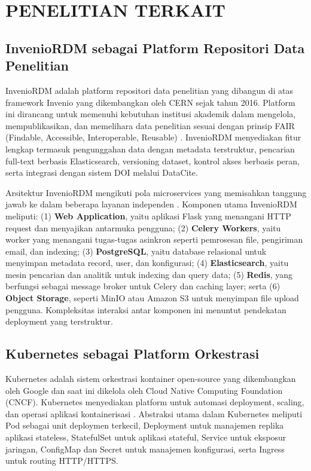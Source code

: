 \chapter{PENELITIAN TERKAIT}

\section{InvenioRDM sebagai Platform Repositori Data Penelitian}

InvenioRDM adalah platform repositori data penelitian yang dibangun di atas framework Invenio yang dikembangkan oleh CERN sejak tahun 2016. Platform ini dirancang untuk memenuhi kebutuhan institusi akademik dalam mengelola, mempublikasikan, dan memelihara data penelitian sesuai dengan prinsip FAIR (Findable, Accessible, Interoperable, Reusable) \citep{invenio2024}. InvenioRDM menyediakan fitur lengkap termasuk pengunggahan data dengan metadata terstruktur, pencarian full-text berbasis Elasticsearch, versioning dataset, kontrol akses berbasis peran, serta integrasi dengan sistem DOI melalui DataCite.

Arsitektur InvenioRDM mengikuti pola microservices yang memisahkan tanggung jawab ke dalam beberapa layanan independen \citep{invenio2024}. Komponen utama InvenioRDM meliputi: (1) \textbf{Web Application}, yaitu aplikasi Flask yang menangani HTTP request dan menyajikan antarmuka pengguna; (2) \textbf{Celery Workers}, yaitu worker yang menangani tugas-tugas asinkron seperti pemrosesan file, pengiriman email, dan indexing; (3) \textbf{PostgreSQL}, yaitu database relasional untuk menyimpan metadata record, user, dan konfigurasi; (4) \textbf{Elasticsearch}, yaitu mesin pencarian dan analitik untuk indexing dan query data; (5) \textbf{Redis}, yang berfungsi sebagai message broker untuk Celery dan caching layer; serta (6) \textbf{Object Storage}, seperti MinIO atau Amazon S3 untuk menyimpan file upload pengguna. Kompleksitas interaksi antar komponen ini menuntut pendekatan deployment yang terstruktur.

\section{Kubernetes sebagai Platform Orkestrasi}

Kubernetes adalah sistem orkestrasi kontainer open-source yang dikembangkan oleh Google dan saat ini dikelola oleh Cloud Native Computing Foundation (CNCF). Kubernetes menyediakan platform untuk automasi deployment, scaling, dan operasi aplikasi kontainerisasi \citep{kubernetes2024}. Abstraksi utama dalam Kubernetes meliputi Pod sebagai unit deploymen terkecil, Deployment untuk manajemen replika aplikasi stateless, StatefulSet untuk aplikasi stateful, Service untuk eksposur jaringan, ConfigMap dan Secret untuk manajemen konfigurasi, serta Ingress untuk routing HTTP/HTTPS.

